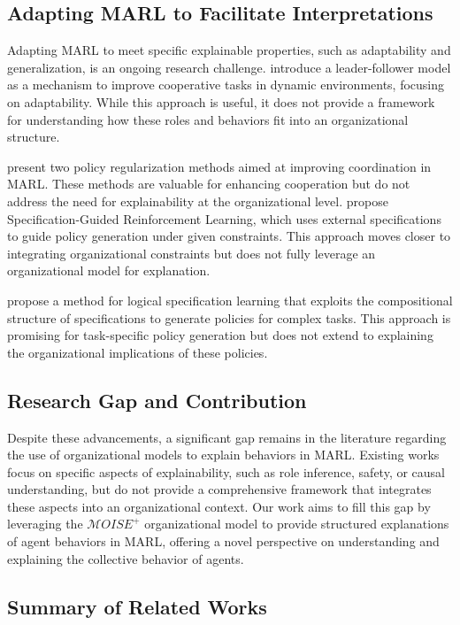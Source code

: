 \documentclass[sn-mathphys-num]{sn-jnl}%
\theoremstyle{thmstyleone}%
\theoremstyle{thmstyletwo}%
\theoremstyle{thmstylethree}%
\begin{document}
\subsection{Adapting MARL to Facilitate Interpretations}

Adapting MARL to meet specific explainable properties, such as adaptability and generalization, is an ongoing research challenge. \cite{shao2022leaderfollower} introduce a leader-follower model as a mechanism to improve cooperative tasks in dynamic environments, focusing on adaptability. While this approach is useful, it does not provide a framework for understanding how these roles and behaviors fit into an organizational structure.

\cite{roy2020policy} present two policy regularization methods aimed at improving coordination in MARL. These methods are valuable for enhancing cooperation but do not address the need for explainability at the organizational level. \cite{bansal2022specification} propose Specification-Guided Reinforcement Learning, which uses external specifications to guide policy generation under given constraints. This approach moves closer to integrating organizational constraints but does not fully leverage an organizational model for explanation.

\cite{jothimurugan2021logicspec} propose a method for logical specification learning that exploits the compositional structure of specifications to generate policies for complex tasks. This approach is promising for task-specific policy generation but does not extend to explaining the organizational implications of these policies.

\subsection{Research Gap and Contribution}

Despite these advancements, a significant gap remains in the literature regarding the use of organizational models to explain behaviors in MARL. Existing works focus on specific aspects of explainability, such as role inference, safety, or causal understanding, but do not provide a comprehensive framework that integrates these aspects into an organizational context. Our work aims to fill this gap by leveraging the $\mathcal{M}OISE^+$ organizational model to provide structured explanations of agent behaviors in MARL, offering a novel perspective on understanding and explaining the collective behavior of agents.

\subsection{Summary of Related Works}
\end{document}
